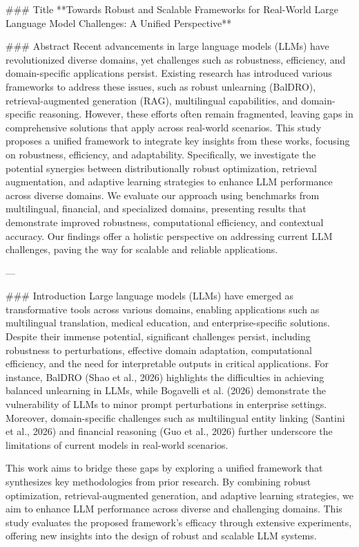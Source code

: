 ### Title
**Towards Robust and Scalable Frameworks for Real-World Large Language Model Challenges: A Unified Perspective**

### Abstract
Recent advancements in large language models (LLMs) have revolutionized diverse domains, yet challenges such as robustness, efficiency, and domain-specific applications persist. Existing research has introduced various frameworks to address these issues, such as robust unlearning (BalDRO), retrieval-augmented generation (RAG), multilingual capabilities, and domain-specific reasoning. However, these efforts often remain fragmented, leaving gaps in comprehensive solutions that apply across real-world scenarios. This study proposes a unified framework to integrate key insights from these works, focusing on robustness, efficiency, and adaptability. Specifically, we investigate the potential synergies between distributionally robust optimization, retrieval augmentation, and adaptive learning strategies to enhance LLM performance across diverse domains. We evaluate our approach using benchmarks from multilingual, financial, and specialized domains, presenting results that demonstrate improved robustness, computational efficiency, and contextual accuracy. Our findings offer a holistic perspective on addressing current LLM challenges, paving the way for scalable and reliable applications.

---

### Introduction
Large language models (LLMs) have emerged as transformative tools across various domains, enabling applications such as multilingual translation, medical education, and enterprise-specific solutions. Despite their immense potential, significant challenges persist, including robustness to perturbations, effective domain adaptation, computational efficiency, and the need for interpretable outputs in critical applications. For instance, BalDRO (Shao et al., 2026) highlights the difficulties in achieving balanced unlearning in LLMs, while Bogavelli et al. (2026) demonstrate the vulnerability of LLMs to minor prompt perturbations in enterprise settings. Moreover, domain-specific challenges such as multilingual entity linking (Santini et al., 2026) and financial reasoning (Guo et al., 2026) further underscore the limitations of current models in real-world scenarios.

This work aims to bridge these gaps by exploring a unified framework that synthesizes key methodologies from prior research. By combining robust optimization, retrieval-augmented generation, and adaptive learning strategies, we aim to enhance LLM performance across diverse and challenging domains. This study evaluates the proposed framework's efficacy through extensive experiments, offering new insights into the design of robust and scalable LLM systems.

